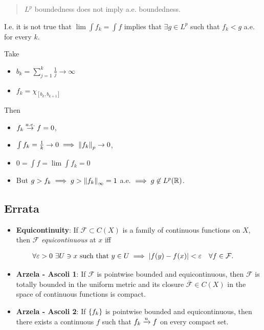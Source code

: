 \begin{quote}
\(L^p\) boundedness does not imply a.e. boundedness.
\end{quote}

I.e. it is not true that \(\lim \int f_k = \int f\) implies that
\(\exists g\in L^p\) such that \(f_k < g\) a.e. for every \(k\).

Take

\begin{itemize}
\item
  \(b_k = \sum_{j=1}^k \frac 1 j \to \infty\)
\item
  \(f_k = \chi_{[b_k, b_{k+1}]}\)
\end{itemize}

Then

\begin{itemize}
\item
  \(f_k \overset{a.e.}\to f = 0\),
\item
  \(\int f_k = \frac 1 k \to 0 \implies {\left\lVert {f_k} \right\rVert}_p \to 0\),
\item
  \(0 = \int f = \lim \int f_k = 0\)
\item
  But \(g > f_k \implies g > {\left\lVert {f_k} \right\rVert}_\infty = 1\) a.e.
  \(\implies g\not\in L^p({\mathbb{R}})\).
\end{itemize}

\hypertarget{errata}{%
\subsection{Errata}\label{errata}}

\begin{itemize}
\tightlist
\item
  \textbf{Equicontinuity}: If \(\mathcal F \subset C(X)\) is a family of
  continuous functions on \(X\), then \(\mathcal F\)
  \emph{equicontinuous} at \(x\) iff
\end{itemize}

\begin{align*}
\forall \varepsilon > 0 ~~\exists U \ni x \text{ such that } y\in U \implies {\left\lvert {f(y) - f(x)} \right\rvert} < \varepsilon \quad \forall f\in \mathcal{F}
.\end{align*}

\begin{itemize}
\item
  \textbf{Arzela - Ascoli 1}: If \(\mathcal{F}\) is pointwise bounded
  and equicontinuous, then \(\mathcal{F}\) is totally bounded in the
  uniform metric and its closure \(\overline{\mathcal{F}} \in C(X)\) in
  the space of continuous functions is compact.
\item
  \textbf{Arzela - Ascoli 2}: If \(\left\{{f_k}\right\}\) is pointwise bounded
  and equicontinuous, then there exists a continuous \(f\) such that
  \(f_k \xrightarrow{u} f\) on every compact set.
\end{itemize}

